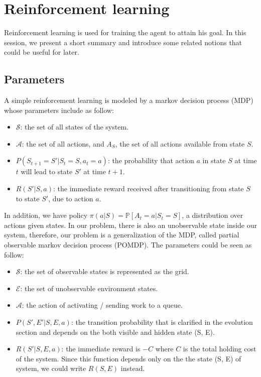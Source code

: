 \documentclass[
  a4paper, xcolor = usenames,dvipsnames]{article}
\providecommand{\tightlist}{%
  \setlength{\itemsep}{0pt}\setlength{\parskip}{0pt}}
\begin{document}
\hypertarget{reinforcement-learning}{%
\section{Reinforcement learning}\label{reinforcement-learning}}

Reinforcement learning is used for training the agent to attain his goal. In this session, we present a short summary and introduce some related notions that could be useful for later.

\hypertarget{parameters-2}{%
\subsection{Parameters}\label{parameters-2}}

A simple reinforcement learning is modeled by a markov decision process (MDP) whose parameters include as follow:

\begin{itemize}
\tightlist
\item
  \(\mathcal{S}\): the set of all states of the system.
\item
  \(\mathcal{A}\): the set of all actions, and \(A_{S}\), the set of all actions available from state \(S\).
\item
  \(P(S_{t + 1} = S' | S_{t} = S, a_{t} = a)\): the probability that action \(a\) in state \(S\) at time \(t\) will lead to state \(S'\) at time \(t + 1\).
\item
  \(R(S' | S, a)\): the immediate reward received after transitioning from state \(S\) to state \(S'\), due to action \(a\).
\end{itemize}

In addition, we have policy \(\pi(a | S) = \mathbb{P}[A_{t} = a | S_{t} = S]\), a distribution over actions given states. In our problem, there is also an unobservable state inside our system, therefore, our problem is a generalization of the MDP, called partial observable markov decision process (POMDP). The parameters could be seen as follow:

\begin{itemize}
\tightlist
\item
  \(\mathcal{S}\): the set of observable states is represented as the grid.
\item
  \(\mathcal{E}\): the set of unobservable environment states.
\item
  \(\mathcal{A}\): the action of activating / sending work to a queue.
\item
  \(P(S', E' | S, E, a)\): the transition probability that is clarified in the evolution section and depends on the both visible and hidden state (S, E).
\item
  \(R(S' | S, E, a)\): the immediate reward is \(-C\) where \(C\) is the total holding cost of the system. Since this function depends only on the the state (S, E) of system, we could write \(R(S, E)\) instead.
\end{itemize}
\end{document}
